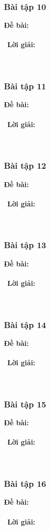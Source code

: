 \documentclass[a4paper]{article}
\begin{document}
\subsubsection{Bài tập 10}
\textbf{Đề bài:} 
\\\ \\\
\textbf{Lời giải:} \\\ \\\
\clearpage
\subsubsection{Bài tập 11}
\textbf{Đề bài:} 
\\\ \\\
\textbf{Lời giải:} \\\ \\\
\clearpage
\subsubsection{Bài tập 12}
\textbf{Đề bài:} 
\\\ \\\
\textbf{Lời giải:} \\\ \\\
\clearpage
\subsubsection{Bài tập 13}
\textbf{Đề bài:} 
\\\ \\\
\textbf{Lời giải:} \\\ \\\
\clearpage
\subsubsection{Bài tập 14}
\textbf{Đề bài:} 
\\\ \\\
\textbf{Lời giải:} \\\ \\\
\clearpage
\subsubsection{Bài tập 15}
\textbf{Đề bài:} 
\\\ \\\
\textbf{Lời giải:} \\\ \\\
\clearpage
\subsubsection{Bài tập 16}
\textbf{Đề bài:} 
\\\ \\\
\textbf{Lời giải:} \\\ \\\
\clearpage
\end{document}
